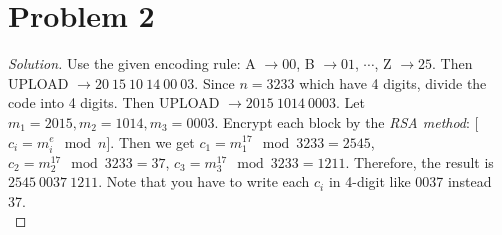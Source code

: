 \section*{Problem 2}
	\begin{proof} [Solution]
		Use the given encoding rule: A $\rightarrow 00$, B $\rightarrow 01$, $\cdots$, Z $\rightarrow 25$. Then UPLOAD $\rightarrow 20\ 15\ 10\ 14\ 00\ 03$. Since $n = 3233$ which have 4 digits,  divide the code into 4 digits. Then UPLOAD $\rightarrow 2015\ 1014\ 0003$. Let $m_1 = 2015, m_2 = 1014, m_3 = 0003$. Encrypt each block by the \textit{RSA method}: [$c_i = m_i^e \mod n$]. Then we get $c_1 = m_1^{17} \mod 3233 = 2545$, $c_2 = m_2^{17} \mod 3233 = 37$, $c_3 = m_3^{17} \mod 3233 = 1211$. Therefore, the result is $2545\ 0037\ 1211$. Note that you have to write each $c_i$ in 4-digit like 0037 instead 37.\\
	\end{proof}